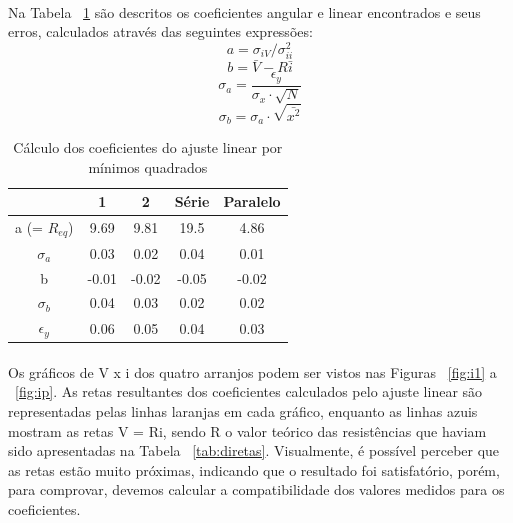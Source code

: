 \documentclass[11pt,a4paper]{article}
\begin{document}
    \paragraph{}
    Na Tabela ~\ref{tab:mmq} são descritos os coeficientes angular e linear encontrados e seus erros, calculados através das seguintes expressões:
    $$a = \sigma_{iV}/\sigma_{ii}^2$$
    $$b = \bar{V} - R\bar{i}$$
    $$\sigma_{a} = \frac{\epsilon_{y}}{\sigma_{x} \cdot \sqrt{N}}$$
    $$\sigma_{b} = \sigma_{a} \cdot \sqrt{\bar{x^2}}$$
   
    \begin{table}[htb!]
      \centering
      \begin{tabular}{c|c|c|c|c}
        \toprule
                      & 1     & 2     & Série & Paralelo \\
        \midrule
        a (= $R_{eq}$) & 9.69  & 9.81  & 19.5  & 4.86  \\
        $\sigma_{a}$   & 0.03  & 0.02  & 0.04  & 0.01  \\
        b              & -0.01 & -0.02 & -0.05 & -0.02 \\
        $\sigma_{b}$   & 0.04  & 0.03  & 0.02  & 0.02  \\
        $\epsilon_{y}$ & 0.06  & 0.05  & 0.04  & 0.03  \\
        \bottomrule
      \end{tabular}
      \caption{Cálculo dos coeficientes do ajuste linear por mínimos quadrados}
      \label{tab:mmq}
    \end{table} 
    
    \paragraph{}
    Os gráficos de V x i dos quatro arranjos podem ser vistos nas Figuras ~\ref{fig:i1} a ~\ref{fig:ip}. As retas resultantes dos coeficientes calculados pelo ajuste linear são representadas pelas linhas laranjas em cada gráfico, enquanto as linhas azuis mostram as retas V = Ri, sendo R o valor teórico das resistências que haviam sido apresentadas na Tabela ~\ref{tab:diretas}. Visualmente, é possível perceber que as retas estão muito próximas, indicando que o resultado foi satisfatório, porém, para comprovar, devemos calcular a compatibilidade dos valores medidos para os coeficientes.
\end{document}
